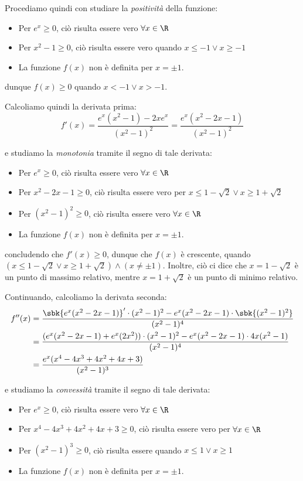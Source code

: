 \documentclass[a4paper, 12pt]{report}
\begin{document}
    Procediamo quindi con studiare la \textit{positività} della funzione:
    \begin{itemize}
        \item Per $e^x \geq 0$, ciò risulta essere vero $\forall x \in \R$
        \item Per $x^2-1 \geq 0$, ciò risulta essere vero quando $x \leq -1 \lor x \geq -1$
        \item La funzione $f(x)$ non è definita per $x = \pm 1$.
    \end{itemize}
    dunque $f(x) \geq 0$ quando $x < -1 \lor x > -1$. 

    Calcoliamo quindi la derivata prima:
    \[f'(x) =  \frac{e^x(x^2-1) - 2xe^x}{(x^2-1)^2} = \frac{e^x(x^2-2x-1)}{(x^2-1)^2}\]

    e studiamo la \textit{monotonia} tramite il segno di tale derivata:
    \begin{itemize}
        \item Per $e^{x} \geq 0$, ciò risulta essere vero $\forall x \in \R$
        \item Per $x^2-2x-1 \geq 0$, ciò risulta essere vero per $x \leq 1-\sqrt{2} \lor x \geq 1 + \sqrt{2}$
        \item Per $(x^2-1)^2 \geq 0$, ciò risulta essere vero $\forall x \in \R$
        \item La funzione $f(x)$ non è definita per $x = \pm 1$.
    \end{itemize}

    concludendo che $f'(x) \geq 0$, dunque che $f(x)$ è crescente, quando $(x \leq 1-\sqrt{2} \lor x \geq 1 + \sqrt{2}) \land (x \neq \pm 1)$. Inoltre, ciò ci dice che $x = 1-\sqrt{2}$ è un punto di massimo relativo, mentre $x = 1+\sqrt{2}$ è un punto di minimo relativo.

    Continuando, calcoliamo la derivata seconda:
    \[\begin{split}
        f''(x) &= \frac{\sbk{e^x(x^2-2x-1)}' \cdot (x^2-1)^2 - e^x(x^2-2x-1) \cdot \sbk{(x^2-1)^2}}{(x^2-1)^4} \\
        &= \frac{(e^x(x^2-2x-1)+e^x(2x^2)) \cdot (x^2-1)^2 - e^x(x^2-2x-1) \cdot 4x(x^2-1)}{(x^2-1)^4} \\
        &= \frac{e^x(x^4 -4x^3 + 4x^2 + 4x + 3)}{(x^2-1)^3}
    \end{split}\]

    e studiamo la \textit{convessità} tramite il segno di tale derivata:
    \begin{itemize}
        \item Per $e^{x} \geq 0$, ciò risulta essere vero $\forall x \in \R$
        \item Per $x^4 -4x^3 + 4x^2 + 4x + 3 \geq 0$, ciò risulta essere vero per $\forall x \in \R$
        \item Per $(x^2-1)^3 \geq 0$, ciò risulta essere quando $x \leq 1 \lor x \geq 1$
        \item La funzione $f(x)$ non è definita per $x = \pm 1$.
    \end{itemize}
\end{document}
